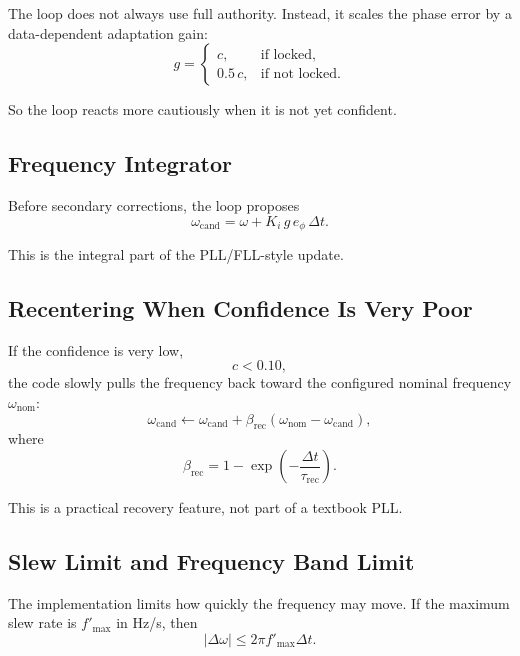 \documentclass[conference]{IEEEtran}
\begin{document}
The loop does not always use full authority. Instead, it scales the phase
error by a data-dependent adaptation gain:
\begin{equation}
  g =
  \begin{cases}
    c, & \text{if locked},\\[4pt]
    0.5\,c, & \text{if not locked}.
  \end{cases}
\end{equation}

So the loop reacts more cautiously when it is not yet confident.

\subsection{Frequency Integrator}

Before secondary corrections, the loop proposes
\begin{equation}
  \omega_{\mathrm{cand}}
  =
  \omega + K_i\,g\,e_\phi\,\Delta t.
\end{equation}

This is the integral part of the PLL/FLL-style update.

\subsection{Recentering When Confidence Is Very Poor}

If the confidence is very low,
\begin{equation}
  c < 0.10,
\end{equation}
the code slowly pulls the frequency back toward the configured nominal
frequency \(\omega_{\mathrm{nom}}\):
\begin{equation}
  \omega_{\mathrm{cand}}
  \leftarrow
  \omega_{\mathrm{cand}}
  +
  \beta_{\mathrm{rec}}
  (\omega_{\mathrm{nom}} - \omega_{\mathrm{cand}}),
\end{equation}
where
\begin{equation}
  \beta_{\mathrm{rec}} = 1 - \exp\!\left(-\frac{\Delta t}{\tau_{\mathrm{rec}}}\right).
\end{equation}

This is a practical recovery feature, not part of a textbook PLL.

\subsection{Slew Limit and Frequency Band Limit}

The implementation limits how quickly the frequency may move. If the maximum
slew rate is \(f'_{\max}\) in \si{Hz/s}, then
\begin{equation}
  |\Delta\omega| \le 2\pi f'_{\max}\Delta t.
\end{equation}
\end{document}
